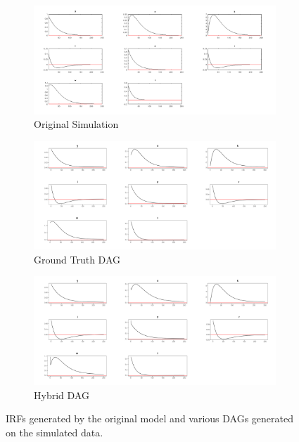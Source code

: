 \documentclass{article}
\begin{document}
\begin{figure}

  \centering
  \begin{subfigure}{0.8\textwidth}
    \centering
    \includegraphics[width=\linewidth]{images/rbc_sim_irf.png} 
    \caption{Original Simulation}
    \label{simirf}
  \end{subfigure}
  \begin{subfigure}{0.8\textwidth}
    \centering  
    \includegraphics[width=\linewidth]{images/rbc_true_dag_irfs.png}
    \caption{Ground Truth DAG}
    \label{gtirf}
  \end{subfigure}
  \begin{subfigure}{0.8\textwidth}
    \centering  
    \includegraphics[width=\linewidth]{images/rbc_hybrid_dag_irfs.png}
    \caption{Hybrid DAG}
    \label{hirf}
  \end{subfigure}

  \caption{IRFs generated by the original model and various DAGs generated on the simulated data.}
  \label{dag10}
\end{figure}
\end{document}
